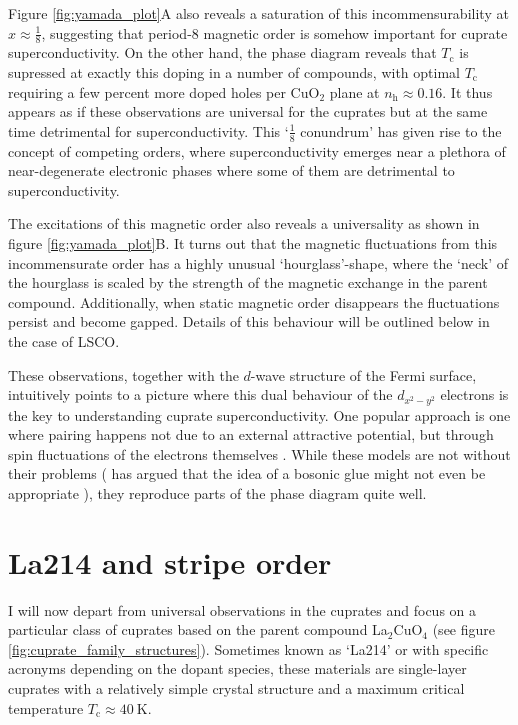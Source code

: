 Figure \ref{fig:yamada_plot}A also reveals a saturation of this incommensurability at $x \approx \frac{1}{8}$, suggesting that period-8 magnetic order is somehow important for cuprate superconductivity. On the other hand, the phase diagram reveals that $T_\text{c}$ is supressed at exactly this doping in a number of compounds, with optimal $T_\text{c}$ requiring a few percent more doped holes per CuO$_2$ plane at $n_\text{h} \approx 0.16$. It thus appears as if these observations are universal for the cuprates but at the same time detrimental for superconductivity. This `$\frac{1}{8}$ conundrum' has given rise to the concept of competing orders, where superconductivity emerges near a plethora of near-degenerate electronic phases where some of them are detrimental to superconductivity.

The excitations of this magnetic order also reveals a universality as shown in figure \ref{fig:yamada_plot}B. It turns out that the magnetic fluctuations from this incommensurate order has a highly unusual `hourglass'-shape, where the `neck' of the hourglass is scaled by the strength of the magnetic exchange in the parent compound. Additionally, when static magnetic order disappears the fluctuations persist and become gapped. Details of this behaviour will be outlined below in the case of LSCO.

These observations, together with the $d$-wave structure of the Fermi surface, intuitively points to a picture where this dual behaviour of the $d_{x^2-y^2}$ electrons is the key to understanding cuprate superconductivity. One popular approach is one where pairing happens not due to an external attractive potential, but through spin fluctuations of the electrons themselves \cite{Scalapino2012}. While these models are not without their problems (\citeauthor{Anderson2007} has argued that the idea of a bosonic glue might not even be appropriate \cite{Anderson2007}), they reproduce parts of the phase diagram quite well.

\section{La214 and stripe order}\label{sec:lsco}
I will now depart from universal observations in the cuprates and focus on a particular class of cuprates based on the parent compound La$_2$CuO$_4$ (see figure \ref{fig:cuprate_family_structures}). Sometimes known as `La214' or with specific acronyms depending on the dopant species, these materials are single-layer cuprates with a relatively simple crystal structure and a maximum critical temperature $T_\text{c} \approx \SI{40}{\kelvin}$.

